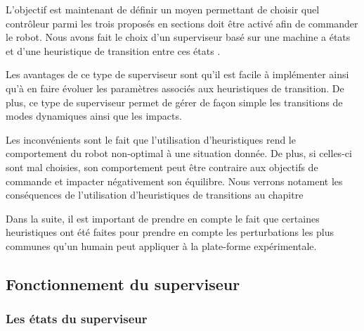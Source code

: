 			
			L'objectif est maintenant de définir un moyen permettant de choisir quel contrôleur parmi les trois proposés en sections  doit être activé afin de commander le robot.
			Nous avons fait le choix d'un superviseur basé sur une machine a états et d'une heuristique de transition entre ces états .
		
			Les avantages de ce type de superviseur sont qu'il est facile à implémenter ainsi qu'à en faire évoluer les paramètres associés aux heuristiques de transition.
			De plus, ce type de superviseur permet de gérer de façon simple les transitions de modes dynamiques ainsi que les impacts.
			
			Les inconvénients sont le fait que l'utilisation d'heuristiques rend le comportement du robot non-optimal à une situation donnée.
			De plus, si celles-ci sont mal choisies, son comportement peut être contraire aux objectifs de commande et impacter négativement son équilibre. 
			Nous verrons notament les conséquences de l'utilisation d'heuristiques de transitions au chapitre 
			
			Dans la suite, il est important de prendre en compte le fait que certaines heuristiques ont été faites pour prendre en compte les perturbations les plus communes qu'un humain peut appliquer à la plate-forme expérimentale.
			
		\subsection{Fonctionnement du superviseur}

			
			\subsubsection{Les états du superviseur}
				

